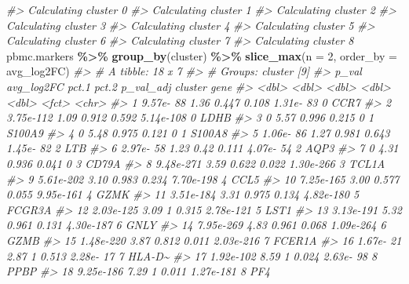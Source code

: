 \documentclass[
]{book}
\newenvironment{Shaded}{\begin{snugshade}}{\end{snugshade}}
\newcommand{\AttributeTok}[1]{\textcolor[rgb]{0.13,0.29,0.53}{#1}}
\newcommand{\CommentTok}[1]{\textcolor[rgb]{0.56,0.35,0.01}{\textit{#1}}}
\newcommand{\DecValTok}[1]{\textcolor[rgb]{0.00,0.00,0.81}{#1}}
\newcommand{\FunctionTok}[1]{\textcolor[rgb]{0.13,0.29,0.53}{\textbf{#1}}}
\newcommand{\NormalTok}[1]{#1}
\newcommand{\SpecialCharTok}[1]{\textcolor[rgb]{0.81,0.36,0.00}{\textbf{#1}}}
\begin{document}
\begin{Shaded}
\begin{Highlighting}[]
\CommentTok{\#\textgreater{} Calculating cluster 0}
\CommentTok{\#\textgreater{} Calculating cluster 1}
\CommentTok{\#\textgreater{} Calculating cluster 2}
\CommentTok{\#\textgreater{} Calculating cluster 3}
\CommentTok{\#\textgreater{} Calculating cluster 4}
\CommentTok{\#\textgreater{} Calculating cluster 5}
\CommentTok{\#\textgreater{} Calculating cluster 6}
\CommentTok{\#\textgreater{} Calculating cluster 7}
\CommentTok{\#\textgreater{} Calculating cluster 8}
\NormalTok{pbmc.markers }\SpecialCharTok{\%\textgreater{}\%} \FunctionTok{group\_by}\NormalTok{(cluster) }\SpecialCharTok{\%\textgreater{}\%} \FunctionTok{slice\_max}\NormalTok{(}\AttributeTok{n =} \DecValTok{2}\NormalTok{, }\AttributeTok{order\_by =}\NormalTok{ avg\_log2FC)}
\CommentTok{\#\textgreater{} \# A tibble: 18 x 7}
\CommentTok{\#\textgreater{} \# Groups:   cluster [9]}
\CommentTok{\#\textgreater{}        p\_val avg\_log2FC pct.1 pct.2 p\_val\_adj cluster gene  }
\CommentTok{\#\textgreater{}        \textless{}dbl\textgreater{}      \textless{}dbl\textgreater{} \textless{}dbl\textgreater{} \textless{}dbl\textgreater{}     \textless{}dbl\textgreater{} \textless{}fct\textgreater{}   \textless{}chr\textgreater{} }
\CommentTok{\#\textgreater{}  1 9.57e{-} 88       1.36 0.447 0.108 1.31e{-} 83 0       CCR7  }
\CommentTok{\#\textgreater{}  2 3.75e{-}112       1.09 0.912 0.592 5.14e{-}108 0       LDHB  }
\CommentTok{\#\textgreater{}  3 0               5.57 0.996 0.215 0         1       S100A9}
\CommentTok{\#\textgreater{}  4 0               5.48 0.975 0.121 0         1       S100A8}
\CommentTok{\#\textgreater{}  5 1.06e{-} 86       1.27 0.981 0.643 1.45e{-} 82 2       LTB   }
\CommentTok{\#\textgreater{}  6 2.97e{-} 58       1.23 0.42  0.111 4.07e{-} 54 2       AQP3  }
\CommentTok{\#\textgreater{}  7 0               4.31 0.936 0.041 0         3       CD79A }
\CommentTok{\#\textgreater{}  8 9.48e{-}271       3.59 0.622 0.022 1.30e{-}266 3       TCL1A }
\CommentTok{\#\textgreater{}  9 5.61e{-}202       3.10 0.983 0.234 7.70e{-}198 4       CCL5  }
\CommentTok{\#\textgreater{} 10 7.25e{-}165       3.00 0.577 0.055 9.95e{-}161 4       GZMK  }
\CommentTok{\#\textgreater{} 11 3.51e{-}184       3.31 0.975 0.134 4.82e{-}180 5       FCGR3A}
\CommentTok{\#\textgreater{} 12 2.03e{-}125       3.09 1     0.315 2.78e{-}121 5       LST1  }
\CommentTok{\#\textgreater{} 13 3.13e{-}191       5.32 0.961 0.131 4.30e{-}187 6       GNLY  }
\CommentTok{\#\textgreater{} 14 7.95e{-}269       4.83 0.961 0.068 1.09e{-}264 6       GZMB  }
\CommentTok{\#\textgreater{} 15 1.48e{-}220       3.87 0.812 0.011 2.03e{-}216 7       FCER1A}
\CommentTok{\#\textgreater{} 16 1.67e{-} 21       2.87 1     0.513 2.28e{-} 17 7       HLA{-}D\textasciitilde{}}
\CommentTok{\#\textgreater{} 17 1.92e{-}102       8.59 1     0.024 2.63e{-} 98 8       PPBP  }
\CommentTok{\#\textgreater{} 18 9.25e{-}186       7.29 1     0.011 1.27e{-}181 8       PF4}
\end{Highlighting}
\end{Shaded}
\end{document}
